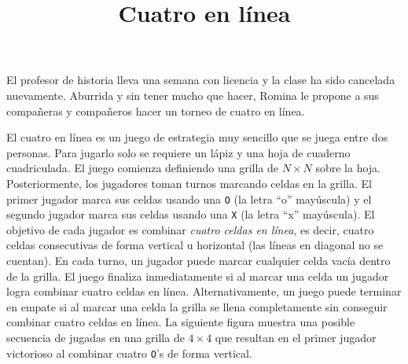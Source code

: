 \documentclass{oci}
\title{Cuatro en línea}
\begin{document}
\begin{problemDescription}
  El profesor de historia lleva una semana con
  licencia y la clase ha sido cancelada nuevamente.
  Aburrida y sin tener mucho que hacer, Romina le
  propone a sus compañeras y compañeros hacer un torneo
  de cuatro en línea.

  El cuatro en línea es un juego de estrategia
  muy sencillo que se juega entre dos personas.
  Para jugarlo solo se requiere un lápiz y una hoja de
  cuaderno cuadriculada.
  El juego comienza definiendo una grilla de
  $N\times N$ sobre la hoja.
  Posteriormente, los jugadores toman turnos
  marcando celdas en la grilla.
  El primer jugador marca sus celdas usando una
  \texttt{O} (la letra ``o'' mayúscula)
  y el segundo jugador marca sus celdas usando una
  \texttt{X} (la letra ``x'' mayúscula).
  El objetivo de cada jugador es combinar \emph{cuatro celdas
  en línea}, es decir, cuatro celdas consecutivas de forma
  vertical u horizontal (las líneas en diagonal no se cuentan).
  En cada turno, un jugador puede marcar cualquier celda vacía
  dentro de la grilla.
  El juego finaliza inmediatamente si al marcar una celda
  un jugador logra combinar cuatro celdas en línea.
  Alternativamente, un juego puede terminar en empate si
  al marcar una celda la grilla se llena completamente
  sin conseguir combinar cuatro celdas en línea.
  La siguiente figura muestra una posible secuencia de jugadas
  en una grilla de $4\times 4$ que resultan en el primer jugador
  victorioso al combinar cuatro \texttt{O}'s de forma vertical.
  \begin{center}
\end{center}
\end{problemDescription}
\end{document}
